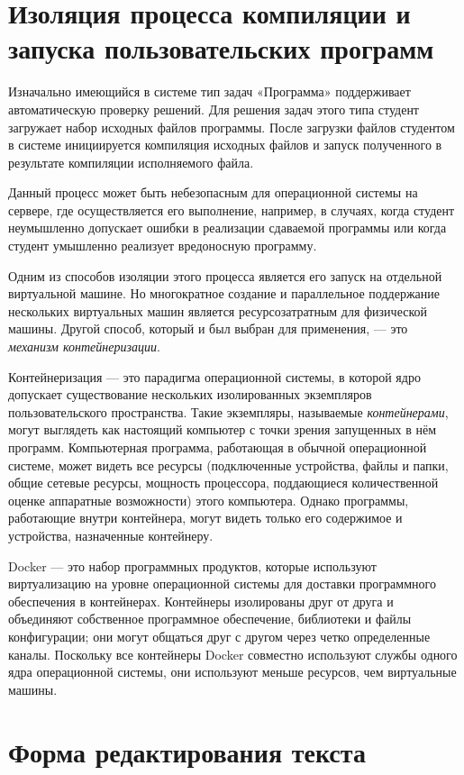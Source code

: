 \documentclass[a4paper]{article}
\begin{document}
\newpage
\section{Изоляция процесса компиляции и запуска пользовательских программ}

Изначально имеющийся в системе тип задач «Программа» поддерживает автоматическую проверку решений. Для решения задач этого типа студент загружает набор исходных файлов программы. После загрузки файлов студентом в системе инициируется компиляция исходных файлов и запуск полученного в результате компиляции исполняемого файла.

Данный процесс может быть небезопасным для операционной системы на сервере, где осуществляется его выполнение, например, в случаях, когда студент неумышленно допускает ошибки в реализации сдаваемой программы или когда студент умышленно реализует вредоносную программу.

Одним из способов изоляции этого процесса является его запуск на отдельной виртуальной машине. Но многократное создание и параллельное поддержание нескольких виртуальных машин является ресурсозатратным для физической машины. Другой способ, который и был выбран для применения, --- это \emph{механизм контейнеризации}.

Контейнеризация --- это парадигма операционной системы, в которой ядро допускает существование нескольких изолированных экземпляров пользовательского пространства. Такие экземпляры, называемые \emph{контейнерами}, могут выглядеть как настоящий компьютер с точки зрения запущенных в нём программ. Компьютерная программа, работающая в обычной операционной системе, может видеть все ресурсы (подключенные устройства, файлы и папки, общие сетевые ресурсы, мощность процессора, поддающиеся количественной оценке аппаратные возможности) этого компьютера. Однако программы, работающие внутри контейнера, могут видеть только его содержимое и устройства, назначенные контейнеру.

Docker --- это набор программных продуктов, которые используют виртуализацию на уровне операционной системы для доставки программного обеспечения в контейнерах. Контейнеры изолированы друг от друга и объединяют собственное программное обеспечение, библиотеки и файлы конфигурации; они могут общаться друг с другом через четко определенные каналы. Поскольку все контейнеры Docker совместно используют службы одного ядра операционной системы, они используют меньше ресурсов, чем виртуальные машины.

\newpage
\section{Форма редактирования текста}
\end{document}
